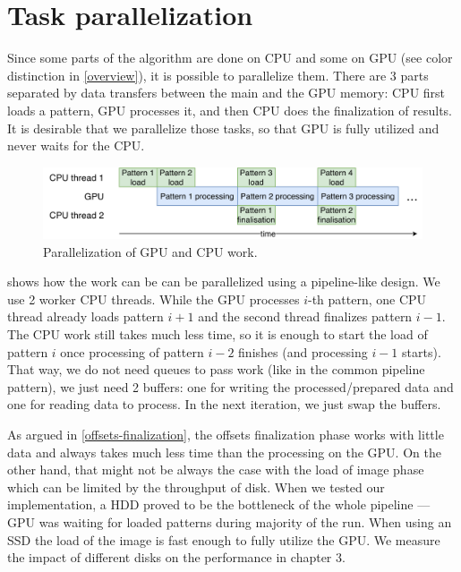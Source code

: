 \section{Task parallelization}
\label{task-paralelization}


Since some parts of the algorithm are done on CPU and some on GPU (see color distinction in \cref{overview}), it is possible to parallelize them. There are 3 parts separated by data transfers between the main and the GPU memory: CPU first loads a pattern, GPU processes it, and then CPU does the finalization of results. It is desirable that we parallelize those tasks, so that GPU is fully utilized and never waits for the CPU.

\begin{figure}
	\centering
	\includegraphics[width=\textwidth]{img/CPUGPUparal}
	\caption{Parallelization of GPU and CPU work.}
	\label{pipeline}
\end{figure}

 shows how the work can be can be parallelized using a pipeline-like design. We use 2 worker CPU threads. While the GPU processes $i$-th pattern, one CPU thread already loads pattern $i+1$ and the second thread finalizes pattern $i-1$. The CPU work still takes much less time, so it is enough to start the load of pattern $i$ once processing of pattern $i-2$ finishes (and processing $i-1$ starts). That way, we do not need queues to pass work (like in the common pipeline pattern), we just need 2 buffers: one for writing the processed/prepared data and one for reading data to process. In the next iteration, we just swap the buffers.

As argued in \cref{offsets-finalization}, the offsets finalization phase works with little data and always takes much less time than the processing on the GPU. On the other hand, that might not be always the case with the load of image phase which can be limited by the throughput of disk. When we tested our implementation, a HDD proved to be the bottleneck of the whole pipeline --- GPU was waiting for loaded patterns during majority of the run. When using an SSD the load of the image is fast enough to fully utilize the GPU. We measure the impact of different disks on the performance in chapter 3.

